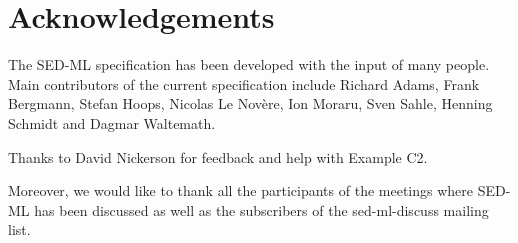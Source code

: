 \chapter{Acknowledgements}
\label{sec:acknowledgments}
The SED-ML specification has been developed with the input of many people. Main contributors of the current specification include Richard Adams, Frank Bergmann, Stefan Hoops, Nicolas Le Nov\`ere, Ion Moraru, Sven Sahle, Henning Schmidt and  Dagmar Waltemath.

Thanks to David Nickerson for feedback and help with Example C2.

Moreover, we would like to thank all the participants of the meetings where SED-ML has been discussed as well as the subscribers of the sed-ml-discuss mailing list.

